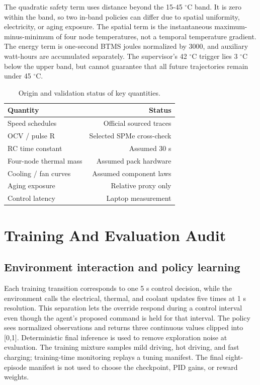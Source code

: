 \documentclass[conference]{IEEEtran}
\begin{document}
The quadratic safety term uses distance beyond the 15-45 $^{\circ}$C band. It is zero within the band, so two in-band policies can differ due to spatial uniformity, electricity, or aging exposure. The spatial term is the instantaneous maximum-minus-minimum of four node temperatures, not a temporal temperature gradient. The energy term is one-second BTMS joules normalized by 3000, and auxiliary watt-hours are accumulated separately. The supervisor's 42 $^{\circ}$C trigger lies 3 $^{\circ}$C below the upper band, but cannot guarantee that all future trajectories remain under 45 $^{\circ}$C.

\begin{table}[t]
\caption{Origin and validation status of key quantities.}
\label{tab:VII}
\centering\footnotesize
\begin{tabular}{lr}
\toprule
Quantity & Status\\
\midrule
Speed schedules & Official sourced traces\\
OCV / pulse R & Selected SPMe cross-check\\
RC time constant & Assumed 30 s\\
Four-node thermal mass & Assumed pack hardware\\
Cooling / fan curves & Assumed component laws\\
Aging exposure & Relative proxy only\\
Control latency & Laptop measurement\\
\bottomrule
\end{tabular}
\end{table}
\section{Training And Evaluation Audit}
\subsection{Environment interaction and policy learning}
Each training transition corresponds to one 5 s control decision, while the environment calls the electrical, thermal, and coolant updates five times at 1 s resolution. This separation lets the override respond during a control interval even though the agent's proposed command is held for that interval. The policy sees normalized observations and returns three continuous values clipped into [0,1]. Deterministic final inference is used to remove exploration noise at evaluation. The training mixture samples mild driving, hot driving, and fast charging; training-time monitoring replays a tuning manifest. The final eight-episode manifest is not used to choose the checkpoint, PID gains, or reward weights.
\end{document}
